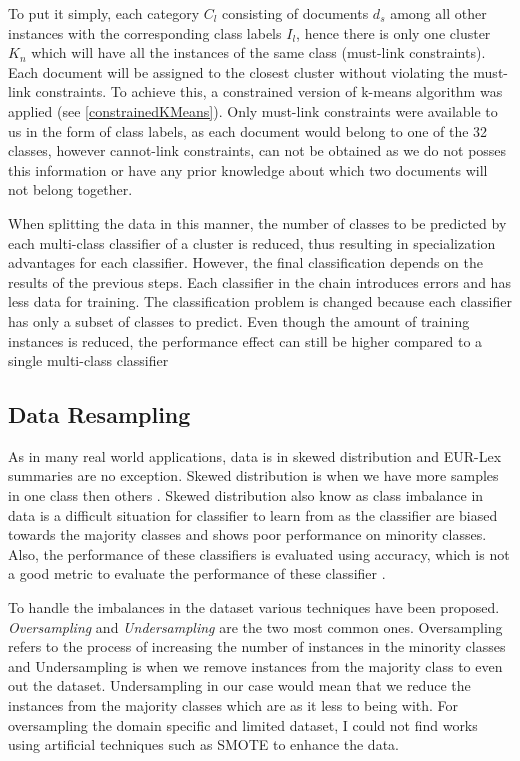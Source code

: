 To put it simply, each category $C_{l}$ consisting of documents $d_{s}$ among all other instances with the corresponding class labels $I_{l}$, hence there is only one cluster $K_{n}$ which will have all the instances of the same class (must-link constraints). Each document will be assigned to the closest cluster without violating the must-link constraints. To achieve this, a constrained version of k-means algorithm was applied (see \ref{constrainedKMeans}). Only must-link constraints were available to us in the form of class labels, as each document would belong to one of the 32 classes, however cannot-link constraints, can not be obtained as we do not posses this information or have any prior knowledge about which two documents will not belong together. 

When splitting the data in this manner, the number of classes to be predicted by each multi-class classifier of a cluster is reduced, thus resulting in specialization advantages for each classifier. However, the final classification depends on the results of the previous steps. Each classifier in the chain introduces errors and has less data for training. The classification problem is changed because each classifier has only a subset of classes to predict. Even though the amount of training instances is reduced, the performance effect can still be higher compared to a single multi-class classifier

\subsection*{Data Resampling}

As in many real world applications, data is in skewed distribution and EUR-Lex summaries are no exception. Skewed distribution is when we have more samples in one class then others \cite{wang2012multiclass}. Skewed distribution also know as class imbalance in data is a difficult situation for classifier to learn from as the classifier are biased towards the majority classes and shows poor performance on minority classes. Also, the performance of these classifiers is evaluated using accuracy, which is not a good metric to evaluate the performance of these classifier \cite{chawla2002smote}.  

To handle the imbalances in the dataset various techniques have been proposed. \textit{Oversampling} and \textit{Undersampling} are the two most common ones. Oversampling refers to the process of increasing the number of instances in the minority classes and Undersampling is when we remove instances from the majority class to even out the dataset. Undersampling in our case would mean that we reduce the instances from the majority classes which are as it less to being with. For oversampling the domain specific and limited dataset, I could not find works using artificial techniques such as SMOTE to enhance the data. 

